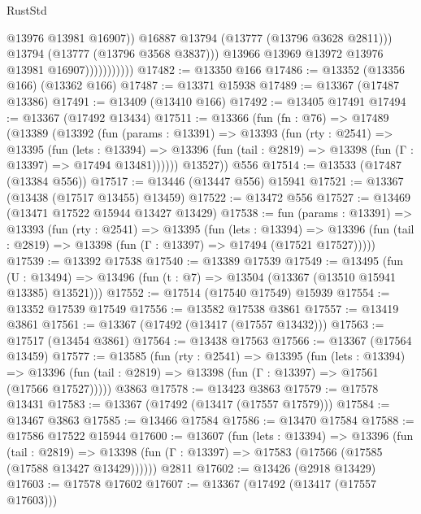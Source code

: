 \begin{lexlean}{RustStd}
\begin{coremodule}
                                  @13976
                                  @13981
                                  @16907))
                              @16887
                              @13794
                              (@13777 (@13796 @3628 @2811)))
                            @13794
                            (@13777 (@13796 @3568 @3837)))
                          @13966
                          @13969
                          @13972
                          @13976
                          @13981
                          @16907)))))))))))
@17482 := @13350 @166
@17486 := @13352 (@13356 @166) (@13362 @166)
@17487 := @13371 @15938
@17489 := @13367 (@17487 @13386)
@17491 := @13409 (@13410 @166)
@17492 := @13405 @17491
@17494 := @13367 (@17492 @13434)
@17511 := @13366
    (fun (fn : @76) =>
    @17489
      (@13389
        (@13392
          (fun (params : @13391) =>
          @13393
            (fun (rty : @2541) =>
            @13395
              (fun (lets : @13394) =>
              @13396 (fun (tail : @2819) => @13398 (fun (Γ : @13397) => @17494 @13481))))))
        @13527))
    @556
@17514 := @13533 (@17487 (@13384 @556))
@17517 := @13446 (@13447 @556) @15941
@17521 := @13367 (@13438 (@17517 @13455) @13459)
@17522 := @13472 @556
@17527 := @13469 (@13471 @17522 @15944 @13427 @13429)
@17538 := fun (params : @13391) =>
  @13393
    (fun (rty : @2541) =>
    @13395
      (fun (lets : @13394) =>
      @13396 (fun (tail : @2819) => @13398 (fun (Γ : @13397) => @17494 (@17521 @17527)))))
@17539 := @13392 @17538
@17540 := @13389 @17539
@17549 := @13495
    (fun (U : @13494) => @13496 (fun (t : @7) => @13504 (@13367 (@13510 @15941 @13385) @13521)))
@17552 := @17514 (@17540 @17549) @15939
@17554 := @13352 @17539 @17549
@17556 := @13582 @17538 @3861
@17557 := @13419 @3861
@17561 := @13367 (@17492 (@13417 (@17557 @13432)))
@17563 := @17517 (@13454 @3861)
@17564 := @13438 @17563
@17566 := @13367 (@17564 @13459)
@17577 := @13585
    (fun (rty : @2541) =>
    @13395
      (fun (lets : @13394) =>
      @13396 (fun (tail : @2819) => @13398 (fun (Γ : @13397) => @17561 (@17566 @17527)))))
    @3863
@17578 := @13423 @3863
@17579 := @17578 @13431
@17583 := @13367 (@17492 (@13417 (@17557 @17579)))
@17584 := @13467 @3863
@17585 := @13466 @17584
@17586 := @13470 @17584
@17588 := @17586 @17522 @15944
@17600 := @13607
    (fun (lets : @13394) =>
    @13396
      (fun (tail : @2819) =>
      @13398 (fun (Γ : @13397) => @17583 (@17566 (@17585 (@17588 @13427 @13429))))))
    @2811
@17602 := @13426 (@2918 @13429)
@17603 := @17578 @17602
@17607 := @13367 (@17492 (@13417 (@17557 @17603)))

\end{coremodule}
\end{lexlean}
